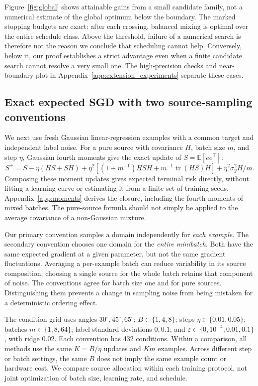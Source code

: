 \documentclass{article}
\theoremstyle{remark}\newtheorem{remark}[theorem]{Remark}
\newcommand{\tr}{\operatorname{tr}}
\newcommand{\E}{\mathbb E}
\begin{document}
Figure~\ref{fig:global} shows attainable gains from a small candidate family, not a numerical estimate of the global optimum below the boundary. The marked stopping budgets are exact: after each crossing, balanced mixing is optimal over the entire schedule class. Above the threshold, failure of a numerical search is therefore not the reason we conclude that scheduling cannot help. Conversely, below it, our proof establishes a strict advantage even when a finite candidate search cannot resolve a very small one. The high-precision checks and near-boundary plot in Appendix~\ref{app:extension_experiments} separate these cases.

\subsection{Exact expected SGD with two source-sampling conventions}
We next use fresh Gaussian linear-regression examples with a common target and independent label noise. For a pure source with covariance $H$, batch size $m$, and step $\eta$, Gaussian fourth moments give the exact update of $S=\E[ee^\top]$:
\begin{equation}
 S^+=S-\eta(HS+SH)+\eta^2\left[(1+m^{-1})HSH+m^{-1}\tr(HS)H\right]
 +\eta^2\sigma_y^2H/m.
\end{equation}
Composing these moment updates gives expected terminal risk directly, without fitting a learning curve or estimating it from a finite set of training seeds. Appendix~\ref{app:moments} derives the closure, including the fourth moments of mixed batches. The pure-source formula should not simply be applied to the average covariance of a non-Gaussian mixture.

Our primary convention samples a domain independently for \emph{each example}. The secondary convention chooses one domain for the \emph{entire minibatch}. Both have the same expected gradient at a given parameter, but not the same gradient fluctuations. Averaging a per-example batch can reduce variability in its source composition; choosing a single source for the whole batch retains that component of noise. The conventions agree for batch size one and for pure sources. Distinguishing them prevents a change in sampling noise from being mistaken for a deterministic ordering effect.

The condition grid uses angles $30^\circ,45^\circ,65^\circ$; $B\in\{1,4,8\}$; steps $\eta\in\{0.01,0.05\}$; batches $m\in\{1,8,64\}$; label standard deviations $0,0.1$; and $\varepsilon\in\{0,10^{-4},0.01,0.1\}$, with ridge $0.02$. Each convention has 432 conditions. Within a comparison, all methods use the same $K=B/\eta$ updates and $Km$ examples. Across different step or batch settings, the same $B$ does not imply the same example count or hardware cost. We compare source allocation within each training protocol, not joint optimization of batch size, learning rate, and schedule.
\end{document}
